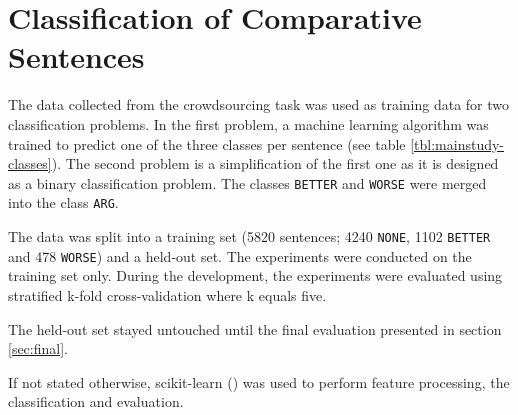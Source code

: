 \chapter{Classification of Comparative Sentences}
The data collected from the crowdsourcing task was used as training data for two classification problems. In the first problem, a machine learning algorithm was trained to predict one of the three classes per sentence (see table \ref{tbl:mainstudy-classes}). The second problem is a simplification of the first one as it is designed as a binary classification problem. The classes \texttt{BETTER} and \texttt{WORSE} were merged into the class \texttt{ARG}.

The data was split into a training set (5820 sentences; 4240 \texttt{NONE}, 1102 \texttt{BETTER} and 478 \texttt{WORSE}) and a held-out set.
The experiments were conducted on the training set only. During the development, the experiments were evaluated using stratified k-fold cross-validation where k equals five. 

The held-out set stayed untouched until the final evaluation presented in section \ref{sec:final}.

If not stated otherwise, scikit-learn (\cite{scikit-learn}) was used to perform feature processing, the classification and evaluation.

